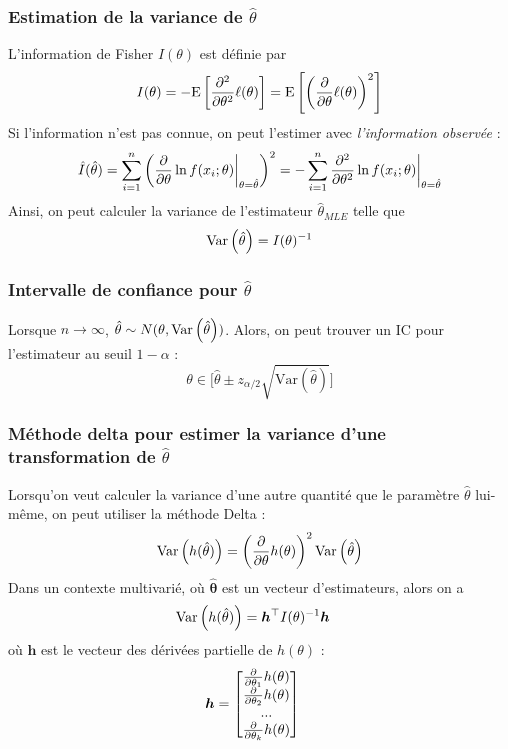\documentclass[french, landscape]{article}
\begin{document}
\begin{multicols*}{3}
\subsubsection*{Estimation de la variance de $\hat{\theta}$}
L'information de Fisher $I(\theta)$ est définie par
\[I(\theta) = -\mathrm{E} \left[ \frac{\partial^2}{\partial \theta^2} \ell(\theta) \right] = \mathrm{E} \left[ \left( \frac{\partial}{\partial \theta} \ell(\theta) \right)^2 \right]\]
Si l'information n'est pas connue, on peut l'estimer avec \emph{l'information observée} : 
\[\hat{I}(\hat{\theta}) = \sum_{i=1}^{n} \left( \frac{\partial}{\partial \theta} \ln f(x_i ; \theta) \biggr \rvert_{\theta = \hat{\theta}} \right)^2 = - \sum_{i=1}^{n}  \frac{\partial^2}{\partial \theta^2} \ln f(x_i ; \theta) \biggr \rvert_{\theta = \hat{\theta}}\]
Ainsi, on peut calculer la variance de l'estimateur $\hat{\theta}_{MLE}$ telle que
\[\mathrm{Var} \left( \hat{\theta} \right) = I(\theta)^{-1}\]

\subsubsection*{Intervalle de confiance pour $\hat{\theta}$}
Lorsque $n \to \infty$, $\hat{\theta} \sim N(\theta,	\mathrm{Var} \left( \hat{\theta} \right))$. Alors, on peut trouver un IC pour l'estimateur au seuil $1 - \alpha$ : 
\[\theta \in \Big [   \hat{\theta} \pm z_{\alpha/2} \sqrt{\mathrm{Var}(\hat{\theta})} \Big ]\]


\subsubsection*{Méthode delta pour estimer la variance d'une transformation de $\hat{\theta}$}
Lorsqu'on veut calculer la variance d'une autre quantité que le paramètre $\hat{\theta}$ lui-même, on peut utiliser la méthode Delta : 
\[\mathrm{Var} \left( h(\hat{\theta}) \right)  = \left( \frac{\partial}{\partial \theta} h(\theta) \right)^2 \mathrm{Var} \left( \hat{\theta} \right)\]
Dans un contexte multivarié, où $\bm{\hat{\theta}}$ est un vecteur d'estimateurs, alors on a
\begin{align*}
\mathrm{Var} \left( h(\hat{\theta}) \right)	& = \bm{h}^{\top} I(\theta)^{-1} \bm{h}
\end{align*}
où $\bm{h}$ est le vecteur des dérivées partielle de $h(\theta)$ : 
\begin{align*}
\bm{h}	& = 
\begin{bmatrix}
\frac{\partial}{\partial \theta_1} h(\theta) \\
\frac{\partial}{\partial \theta_2} h(\theta) \\
... \\
\frac{\partial}{\partial \theta_k} h(\theta) \\
\end{bmatrix}
\end{align*}


\end{multicols*}
\end{document}
